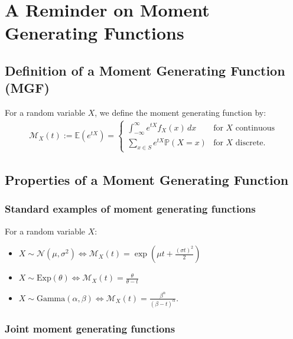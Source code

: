 \documentclass[a4paper, 12pt, twoside]{article}
\begin{document}
\section{A Reminder on Moment Generating Functions}

\subsection{Definition of a Moment Generating Function (MGF)}

For a random variable $X$, we define the moment generating function by:
\begin{align*}
    \mathcal{M}_X(t) := \mathbb{E}(e^{tX}) = \begin{cases}
        \int_{-\infty}^\infty e^{tX} f_X(x) \, dx & \text{for } X \text{ continuous} \\
        \sum_{x \in S} e^{tX} \mathbb{P}(X = x)   & \text{for } X \text{ discrete.}
    \end{cases}
\end{align*}

\subsection{Properties of a Moment Generating Function}

\subsubsection{Standard examples of moment generating functions}

For a random variable $X$:

\begin{itemize}
    \item $X \sim \mathcal{N}(\mu, \sigma^2) \Leftrightarrow
              \mathcal{M}_X(t) = \exp{(\mu t + \frac{(\sigma t)^2}{2})}$
    \item $X \sim \text{Exp}(\theta) \Leftrightarrow
              \mathcal{M}_X(t) = \frac{\theta}{\theta - t}$
    \item $X \sim \text{Gamma}(\alpha, \beta) \Leftrightarrow
              \mathcal{M}_X(t) = \frac{\beta^\alpha}{(\beta - t)^\alpha}$.
\end{itemize}

\subsubsection{Joint moment generating functions}
\end{document}
